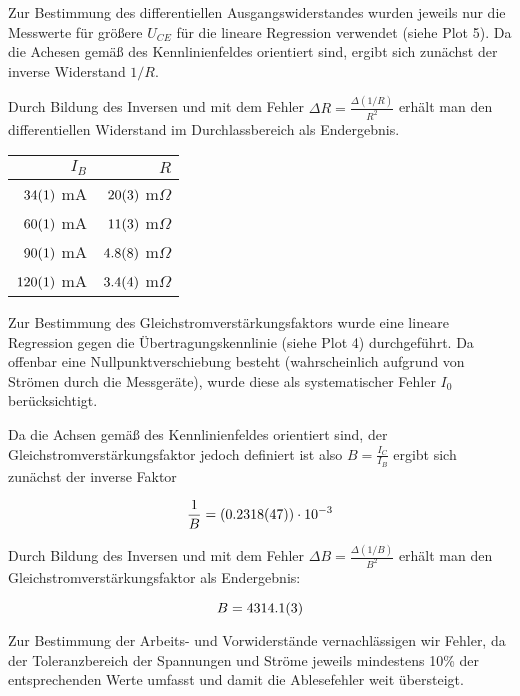 \documentclass[a4paper,german,12pt,smallheadings]{scrartcl}
\begin{document}
Zur Bestimmung des differentiellen Ausgangswiderstandes wurden jeweils nur die
Messwerte für größere $U_{CE}$ für die lineare Regression verwendet (siehe Plot
5). Da die Achesen gemäß des Kennlinienfeldes orientiert sind, ergibt sich
zunächst der inverse Widerstand $1/R$.

Durch Bildung des Inversen und mit dem Fehler $\Delta R =
\frac{\Delta(1/R)}{R^2}$ erhält man den differentiellen Widerstand im
Durchlassbereich als Endergebnis.


\vspace{0.5cm}
\begin{tabular}{ r r }
  $I_B$ & $R$ \\
  \hline
  $\num{34+-1}$ mA & $\num{20+-3}$ $\text{m}\Omega$ \\
  $\num{60+-1}$ mA & $\num{11+-3}$ $\text{m}\Omega$ \\
  $\num{90+-1}$ mA & $\num{4.8+-0.8}$ $\text{m}\Omega$ \\
  $\num{120+-1}$ mA & $\num{3.4+-0.4}$ $\text{m}\Omega$ \\
\end{tabular}
\vspace{0.5cm}


Zur Bestimmung des Gleichstromverstärkungsfaktors wurde eine lineare Regression
gegen die Übertragungskennlinie (siehe Plot 4) durchgeführt. Da offenbar eine
Nullpunktverschiebung besteht (wahrscheinlich aufgrund von Strömen durch die
Messgeräte), wurde diese als systematischer Fehler $I_0$ berücksichtigt.

Da die Achsen gemäß des Kennlinienfeldes orientiert sind, der
Gleichstromverstärkungsfaktor jedoch definiert ist also $B = \frac{I_C}{I_B}$
ergibt sich zunächst der inverse Faktor

\begin{equation}
  \frac{1}{B} = (\num{0.2318+-0.0047}) \cdot 10^{-3}
\end{equation}

Durch Bildung des Inversen und mit dem Fehler $\Delta B =
\frac{\Delta(1/B)}{B^2}$ erhält man den Gleichstromverstärkungsfaktor als
Endergebnis:

\begin{equation}
  B = \num{4314.1+-0.3}
\end{equation}

Zur Bestimmung der Arbeits- und Vorwiderstände vernachlässigen wir Fehler, da
der Toleranzbereich der Spannungen und Ströme jeweils mindestens 10\% der
entsprechenden Werte umfasst und damit die Ablesefehler weit übersteigt.
\end{document}
